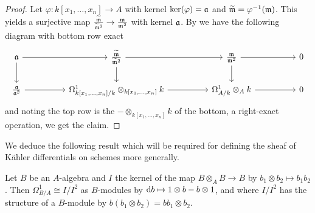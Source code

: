 \begin{proof}
    Let $\varphi:k[x_{1},\dots,x_{n}]\to A$ with kernel $\ker(\varphi)=\mathfrak{a}$ and $\widetilde{\mathfrak{m}}=\varphi^{-1}(\mathfrak{m})$. This yields a surjective map $\frac{\widetilde{\mathfrak{m}}}{\widetilde{\mathfrak{m}}^{2}}\to\frac{\mathfrak{m}}{\mathfrak{m}^{2}}$ with kernel $\mathfrak{a}$. By  we have the following diagram with bottom row exact
    $$%
    \begin{tikzcd}
        \afrak && {\frac{\widetilde{\mfrak}}{\widetilde{\mfrak}^{2}}} && {\frac{\mfrak}{\mfrak^{2}}} && 0 \\
        {\frac{\afrak}{\afrak^{2}}} && {\Omega_{k[x_{1},\dots,x_{n}]/k}^{1}\otimes_{k[x_{1},\dots,x_{n}]}k} && {\Omega_{A/k}^{1}\otimes_{A}k} && 0
        \arrow[from=1-1, to=1-3]
        \arrow[from=1-1, to=2-1]
        \arrow[from=1-3, to=1-5]
        \arrow[from=1-3, to=2-3]
        \arrow[from=1-5, to=1-7]
        \arrow[from=1-5, to=2-5]
        \arrow[from=2-1, to=2-3]
        \arrow[from=2-3, to=2-5]
        \arrow[from=2-5, to=2-7]
    \end{tikzcd}$$
    and noting the top row is the $-\otimes_{k[x_{1},\dots,x_{n}]}k$ of the bottom, a right-exact operation, we get the claim. 
\end{proof}
We deduce the following result which will be required for defining the sheaf of K\"{a}hler differentials on schemes more generally. 
\begin{corollary}\label{corr: diagonal differentials}
    Let $B$ be an $A$-algebra and $I$ the kernel of the map $B\otimes_{A}B\to B$ by $b_{1}\otimes b_{2}\mapsto b_{1}b_{2}$. Then $\Omega_{B/A}^{1}\cong I/I^{2}$ as $B$-modules by $\mathrm{d} b\mapsto 1\otimes b-b\otimes 1$, and where $I/I^{2}$ has the structure of a $B$-module by $b(b_{1}\otimes b_{2})=bb_{1}\otimes b_{2}$. 
\end{corollary}
